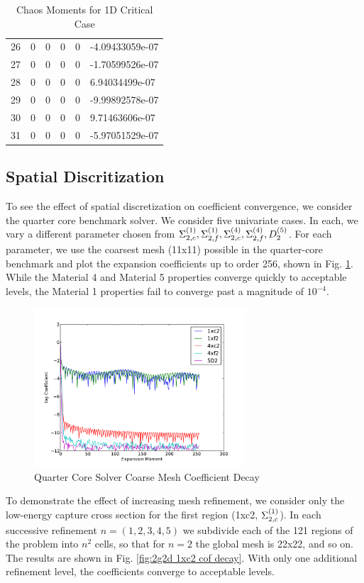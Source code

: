 \begin{table}[H]
\begin{center}
\begin{tabular}{c | l l l l l}
26 & 0 & 0 & 0 & 0 & -4.09433059e-07 \\ 
27 & 0 & 0 & 0 & 0 & -1.70599526e-07 \\ 
28 & 0 & 0 & 0 & 0 & 6.94034499e-07 \\ 
29 & 0 & 0 & 0 & 0 & -9.99892578e-07 \\ 
30 & 0 & 0 & 0 & 0 & 9.71463606e-07 \\ 
31 & 0 & 0 & 0 & 0 & -5.97051529e-07 \\ 
\end{tabular}
\end{center}
\caption{Chaos Moments for 1D Critical Case}
\label{tab:1dcrit coeffs}
\end{table}


\newpage
\subsection{Spatial Discritization}\label{sec:spaceconv}
To see the effect of spatial discretization on coefficient convergence, we consider the quarter core benchmark solver.  We consider five univariate cases.  In each, we vary a different parameter chosen from $\Sigma_{2,c}^{(1)},\Sigma_{2,f}^{(1)},\Sigma_{2,c}^{(4)},\Sigma_{2,f}^{(4)},D_{2}^{(5)}$.  For each parameter, we use the coarsest mesh (11x11) possible in the quarter-core benchmark and plot the expansion coefficients up to order 256, shown in Fig. \ref{fig:2g2d5v coarse cof}.  While the Material 4 and Material 5 properties converge quickly to acceptable levels, the Material 1 properties fail to converge past a magnitude of $10^{-4}$.
\begin{figure}[H]
\centering
   \includegraphics[width=0.7\textwidth]{../graphics/coefficient_decay}
   \caption{Quarter Core Solver Coarse Mesh Coefficient Decay}
   \label{fig:2g2d5v coarse cof}
\end{figure}
To demonstrate the effect of increasing mesh refinement, we consider only the low-energy capture cross section for the first region (1xc2, $\Sigma_{2,c}^{(1)}$).  In each successive refinement $n=(1,2,3,4,5)$ we subdivide each of the 121 regions of the problem into $n^2$ cells, so that for $n=2$ the global mesh is 22x22, and so on.  The results are shown in Fig. \ref{fig:2g2d 1xc2 cof decay}.  With only one additional refinement level, the coefficients converge to acceptable levels.
